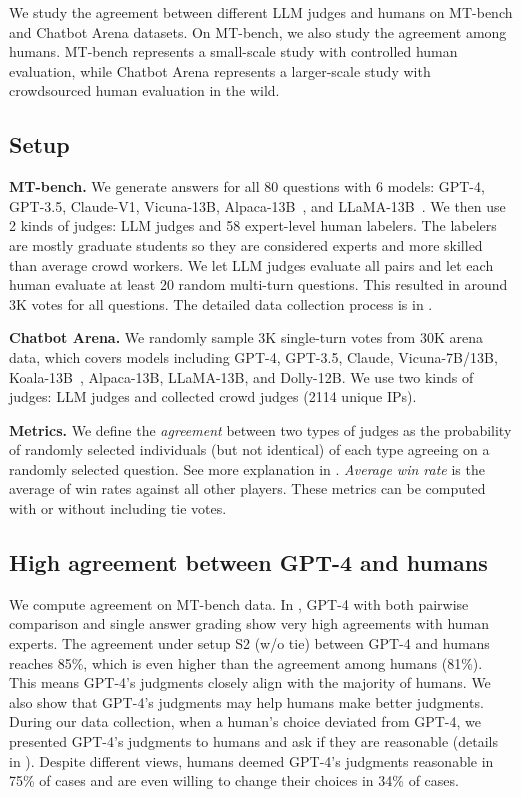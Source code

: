 We study the agreement between different LLM judges and humans on MT-bench and Chatbot Arena datasets. On MT-bench, we also study the agreement among humans. MT-bench represents a small-scale study with controlled human evaluation, while Chatbot Arena represents a larger-scale study with crowdsourced human evaluation in the wild.
\subsection{Setup}

\textbf{MT-bench.}
We generate answers for all 80 questions with 6 models: GPT-4, GPT-3.5, Claude-V1, Vicuna-13B, Alpaca-13B~\cite{alpaca}, and LLaMA-13B~\cite{touvron2023llama}. We then use 2 kinds of judges: LLM judges and 58 expert-level human labelers. The labelers are mostly graduate students so they are considered experts and more skilled than average crowd workers.
We let LLM judges evaluate all pairs and let each human evaluate at least 20 random multi-turn questions. This resulted in around 3K votes for all questions.
The detailed data collection process is in .

\textbf{Chatbot Arena.}
We randomly sample 3K single-turn votes from 30K arena data, which covers models including GPT-4,  GPT-3.5, Claude, Vicuna-7B/13B, Koala-13B~\cite{koala}, Alpaca-13B, LLaMA-13B, and Dolly-12B. We use two kinds of judges: LLM judges and collected crowd judges (2114 unique IPs).


\textbf{Metrics.}
We define the \textit{agreement} between two types of judges as the probability of randomly selected individuals (but not identical) of each type agreeing on a randomly selected question.
See more explanation in .
\textit{Average win rate} is the average of win rates against all other players.
These metrics can be computed with or without including tie votes.

\subsection{High agreement between GPT-4 and humans}
\label{sec:agreement}

We compute agreement on MT-bench data.
In , GPT-4 with both pairwise comparison and single answer grading show very high agreements with human experts.
The agreement under setup S2 (w/o tie) between GPT-4 and humans reaches 85\%, which is even higher than the agreement among humans (81\%). This means GPT-4's judgments closely align with the majority of humans.
We also show that GPT-4's judgments may help humans make better judgments. During our data collection, when a human's choice deviated from GPT-4, we presented GPT-4's judgments to humans and ask if they are reasonable (details in ). Despite different views, humans deemed GPT-4's judgments reasonable in 75\% of cases and are even willing to change their choices in 34\% of cases.


